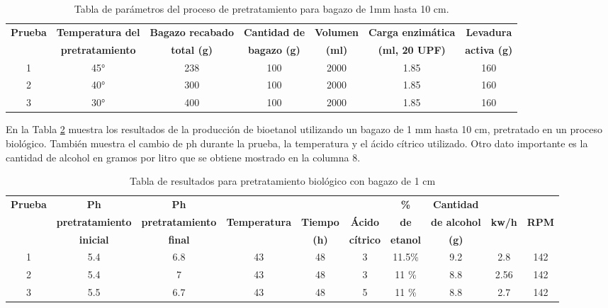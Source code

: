 \documentclass[12pt]{article}
\begin{document}
 	\begin{table}[h!]
 		\centering
 		\caption{Tabla de parámetros del proceso de pretratamiento para bagazo de 1mm hasta 10 cm.}
 		\label{Tabla de parámetros del proceso de pretratamiento para bagazo de 1mm hasta 10 cm.}
 		\resizebox{16cm}{!} {
 			\begin{tabular}{|c|c|c|c|c|c|c|}
 				\hline
 				\textbf{Prueba}	& \textbf{Temperatura del} & \textbf{Bagazo recabado} & \textbf{Cantidad de} & \textbf{Volumen} & \textbf{Carga enzimática} & \textbf{Levadura} \\
 				&	\textbf{pretratamiento} & \textbf{total (g)} & \textbf{bagazo (g)} & \textbf{(ml)} & \textbf{(ml, 20 UPF)} & \textbf{activa (g)} \\ \hline		
 				1	&	45° & 238 & 100 & 2000 & 1.85 & 160 \\ \hline
 				2	&	40° & 300 & 100 & 2000 & 1.85 & 160 \\ \hline
 				3	&	30° & 400 & 100 & 2000 & 1.85 & 160 \\ \hline
 		\end{tabular} }
 		
 	\end{table}
 	
 	En la Tabla 	\ref{tabla biologico3} muestra los resultados de la producción de bioetanol utilizando un bagazo de 1 mm hasta 10 cm, pretratado en un proceso biológico. También muestra el cambio de ph durante la prueba, la temperatura y el ácido cítrico utilizado. Otro dato importante es la cantidad de alcohol en gramos por litro que se obtiene mostrado en la columna 8.
 	
 	\begin{table}[H]
 		\centering
 		\caption{Tabla de resultados para pretratamiento biológico con bagazo de 1 cm}
 		\label{tabla biologico3}
 		\resizebox{16cm}{!} {
 			\begin{tabular}{|c|c|c|c|c|c|c|c|c|c|}
 				\hline
 				\textbf{Prueba}	& \textbf{Ph}& \textbf{Ph} &  &  &  &\textbf{\%} & \textbf{Cantidad} & &\\
 				&	\textbf{pretratamiento} & 	\textbf{pretratamiento} & \textbf{Temperatura} & \textbf{Tiempo} & \textbf{Ácido} & \textbf{de } & \textbf{de alcohol } & \textbf{kw/h}& \textbf{RPM}\\
 				&	\textbf{inicial}& \textbf{final} &  &\textbf{(h)}  & \textbf{cítrico} & \textbf{etanol }& \textbf{(g) }&& \\ \hline		
 				1	&5.4& 6.8 & 43& 48 & 3 & 11.5\% &9.2 & 2.8& 142 \\ \hline
 			
 				2	&5.4& 7& 43 & 48 & 3 & 11 \%  &8.8 & 2.56& 142 \\ \hline
 				3	&5.5& 6.7 & 43& 48 & 5 & 11 \%  &8.8& 2.7&142 \\ \hline
 		\end{tabular} }
 		
 	\end{table}
 	
\end{document}
